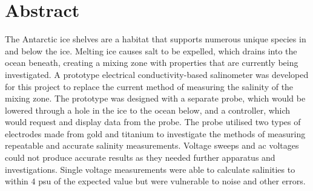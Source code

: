 \chapter*{Abstract}
The Antarctic ice shelves are a habitat that supports numerous unique species in and below the ice.
Melting ice causes salt to be expelled, which drains into the ocean beneath, creating a mixing zone with properties that are currently being investigated.
A prototype electrical conductivity-based salinometer was developed for this project to replace the current method of measuring the salinity of the mixing zone.
The prototype was designed with a separate probe, which would be lowered through a hole in the ice to the ocean below, and a controller, which would request and display data from the probe.
The probe utilised two types of electrodes made from gold and titanium to investigate the methods of measuring repeatable and accurate salinity measurements.
Voltage sweeps and \gls{ac} voltages could not produce accurate results as they needed further apparatus and investigations.
Single voltage measurements were able to calculate salinities to within $4$ \gls{psu} of the expected value but were vulnerable to noise and other errors.